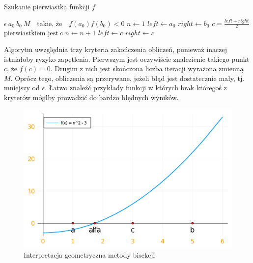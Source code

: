 \documentclass[a4paper]{article}
\begin{document}
    \begin{algorithm}
    \caption{Szukanie pierwiastka funkcji $f$}
    \begin{algorithmic}
    \REQUIRE $\epsilon\ a_0\ b_0\ M \quad \text{takie, że} \quad f(a_0)f(b_0) < 0$
        \STATE $n \leftarrow 1$
        \STATE $left \leftarrow a_0$
        \STATE $right \leftarrow b_0$
        \STATE $c = \frac{left + right}{2}$
        \STATE $\text{pierwiastkiem jest}\ c$
        \ELSE
        \STATE $n \leftarrow n + 1$
        \ENDIF
        \STATE $left \leftarrow c$
        \ELSE
        \STATE $right \leftarrow c$
        \ENDIF
        \ENDWHILE
        \end{algorithmic}
    \end{algorithm}

    Algorytm uwzględnia trzy kryteria zakończenia obliczeń, ponieważ inaczej istniałoby
    ryzyko zapętlenia. Pierwszym jest oczywiście znalezienie takiego punkt $c$, że $f(c) = 0$. Drugim z nich jest 
    skończona liczba iteracji wyrażona zmienną $M$. Oprócz tego, obliczenia są przerywane, 
    jeżeli błąd jest dostatecznie mały, tj. mniejszy od $\epsilon$. Łatwo znaleźć przykłady funkcji w których
    brak któregoś z kryterów mógłby prowadzić do bardzo błędnych wyników.

    \begin{figure}[h]
        \centering
        \includegraphics[width=12cm]{bisectionPlot}
        \caption{Interpretacja geometryczna metody bisekcji}
    \end{figure}

\newpage
\end{document}
